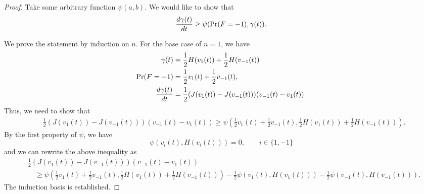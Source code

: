 \documentclass[conference,letterpaper,onecolumn]{IEEEtran}
\theoremstyle{plain}%
\begin{document}
\begin{proof}
Take some arbitrary function $\psi(a,b)$. We would like to show that
$$\frac{d\gamma(t)}{dt} \geq \psi(\textnormal{Pr}(F = -1),\gamma(t)).$$

We prove the statement by induction on $n$. For the base case of $n=1$, we have
\begin{align*}
\gamma(t)&=\frac12 H(v_1(t))+\frac12 H(v_{-1}(t))\\
   \textnormal{Pr}(F = -1)&=\frac12 v_1(t)+\frac12 v_{-1}(t),\\
   \frac{d\gamma(t)}{dt} &= \frac{1}{2}(J(v_{1}(t)) - J(v_{-1}(t)))(v_{-1}(t) - v_{1}(t)).
\end{align*}
Thus, we need to show that
\begin{align*}
    &\frac{1}{2}(J(v_{1}(t)) - J(v_{-1}(t)))(v_{-1}(t) - v_{1}(t))\geq \psi\left( \frac12 v_1(t)+\frac12 v_{-1}(t), \frac12 H(v_1(t))+\frac12 H(v_{-1}(t))\right).
\end{align*}
By the first property of $\psi$, we have
$$\psi\left(  v_i(t), H(v_i(t))\right)=0, \qquad i\in\{1,-1\}$$
and we can rewrite the above inequality as
\begin{align*}
    &\frac{1}{2}(J(v_{1}(t)) - J(v_{-1}(t)))(v_{-1}(t) - v_{1}(t))\\&\quad\geq\psi\left( \frac12 v_1(t)+\frac12 v_{-1}(t), \frac12 H(v_1(t))+\frac12 H(v_{-1}(t))\right)-\frac12\psi\left(  v_1(t), H(v_1(t))\right)-\frac12\psi\left(  v_{-1}(t), H(v_{-1}(t))\right).
\end{align*}
The induction basis is established.


\end{proof}
\end{document}
